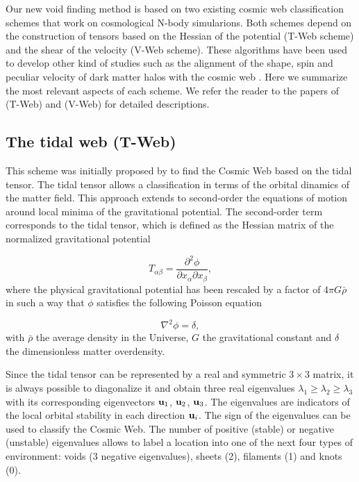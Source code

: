 \documentclass[a4,useAMS,usenatbib,usegraphicx]{mn2e}
\newcommand{\eq}[2]{\begin{equation} \label{eq:#1} #2 \end{equation}}
\begin{document}
Our new void finding method is based on two existing cosmic web
classification schemes that work on cosmological N-body simularions.
Both schemes depend on the construction of tensors based on the
Hessian of the potential (T-Web scheme) and the shear of the velocity
(V-Web scheme). 
These algorithms have been used to develop other
kind of studies such as the alignment of the shape, spin and peculiar
velocity of dark matter halos with the cosmic web
\citep{Libeskind13,Forero2014}. 
Here we summarize the most relevant aspects of each scheme. 
We refer the reader to the papers of \cite{Forero09} (T-Web) and
\cite{Hoffman12} (V-Web) for detailed descriptions.  



\subsection{The tidal web (T-Web)}
\label{subsec:Tweb}

This scheme was initially proposed by \citet{Hahn07}  to find the
Cosmic Web based on the tidal tensor. 
The tidal tensor allows a classification in terms of the orbital
dinamics of the matter field.
This approach extends to second-order the equations of motion around 
local minima of the gravitational potential. 
The second-order term corresponds to the tidal tensor, which is
defined as the Hessian matrix of the normalized gravitational
potential


\eq{V_web}
{	T_{\alpha\beta} = \frac{\partial^2\phi}{\partial x_{\alpha}\partial x_{\beta}},	}
where the physical gravitational potential has been rescaled by a
factor of   $4\pi G\bar{\rho}$ in such a way that $\phi$ satisfies the following 
Poisson equation

\eq{Poisson}
{	\nabla^2\phi = \delta,	}
with $\bar{\rho}$ the average density in the Universe, $G$ the 
gravitational constant and $\delta$ the dimensionless matter
overdensity. 


Since the tidal tensor can be represented by a real and  symmetric
$3\times 3$ matrix, it is always possible to diagonalize  
it and obtain three real eigenvalues $\lambda_{1}\geq\lambda_{2}\geq
\lambda_3$ with its corresponding eigenvectors ${\bf u}_{1}$, ${\bf u}_{2}$,
${\bf u}_{3}$. 
The eigenvalues are indicators of the local  orbital stability
in each direction ${\bf u}_i$. 
The sign of the eigenvalues can be used to classify the Cosmic Web.
The number of positive (stable) or negative (unstable) eigenvalues allows 
to label a location into one of the next four types of environment: 
voids (3 negative eigenvalues), sheets (2), filaments (1) and knots (0). 
\end{document}
